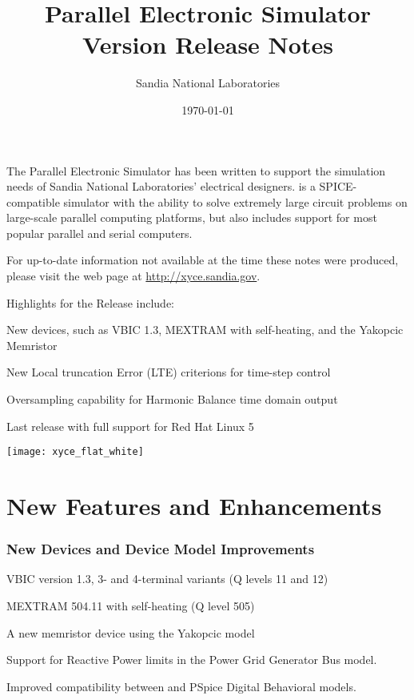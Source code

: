 \documentclass{article}
\title{\XyceTitle{} Parallel Electronic Simulator\\
Version \XyceVersionVar{} Release Notes}
\author{ Sandia National Laboratories}
\date{\today}
\begin{document}
\maketitle

The \XyceTM{} Parallel Electronic Simulator has been written to support the
simulation needs of Sandia National Laboratories' electrical designers.
\XyceTM{} is a SPICE-compatible simulator with the ability to solve extremely
large circuit problems on large-scale parallel computing platforms, but also
includes support for most popular parallel and serial computers.

For up-to-date information not available at the time these notes were produced,
please visit the \XyceTM{} web page at
{\color{XyceDeepRed}\url{http://xyce.sandia.gov}}.

Highlights for the \XyceTM{} \XyceVersionVar{} Release include:
\begin{XyceItemize}
  \item New devices, such as VBIC 1.3, MEXTRAM with self-heating, and the
    Yakopcic Memristor
  \item New Local truncation Error (LTE) criterions for time-step control
  \item Oversampling capability for Harmonic Balance time domain output
  \item Last release with full support for Red Hat Linux 5
\end{XyceItemize}

\tableofcontents
\vspace*{\fill}
\parbox{\textwidth}
{
  \hfill
  \texttt{[image: xyce\_flat\_white]}
}


\newpage
\section{New Features and Enhancements}

\subsubsection*{New Devices and Device Model Improvements}
\begin{XyceItemize}
  \item VBIC version 1.3, 3- and 4-terminal variants (Q levels 11 and 12)
  \item MEXTRAM 504.11 with self-heating (Q level 505)
  \item A new memristor device using the Yakopcic model
  \item Support for Reactive Power limits in the Power Grid Generator Bus
        model.
  \item Improved compatibility between \Xyce{} and PSpice Digital Behavioral
        models. 
\end{XyceItemize}
\end{document}
